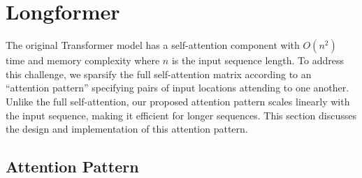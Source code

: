 \section{Longformer}
\label{sec:model}


The original Transformer model has a self-attention component with $O(n^2)$ time and memory complexity where $n$ is the input sequence length. %
To address this challenge, we sparsify the full self-attention matrix according to 
an ``attention pattern'' specifying pairs of input locations attending to one another.
Unlike the full self-attention, our proposed attention pattern scales linearly with the input sequence, making it efficient for longer sequences.
This section discusses the design and implementation of this attention pattern. 


\subsection{Attention Pattern}
\label{sec:attn}

